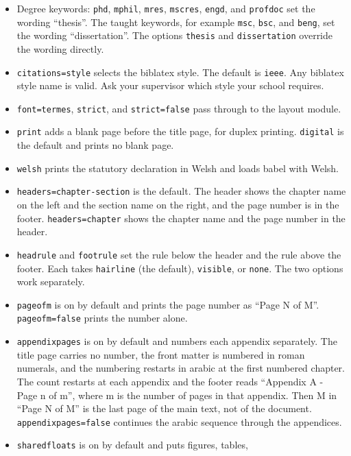 \documentclass[a4paper,12pt]{article}
\begin{document}
\begin{itemize}
  \item Degree keywords: \verb|phd|, \verb|mphil|, \verb|mres|,
        \verb|mscres|, \verb|engd|, and \verb|profdoc| set the wording
        ``thesis''. The taught keywords, for example \verb|msc|, \verb|bsc|,
        and \verb|beng|, set the wording ``dissertation''. The options
        \verb|thesis| and \verb|dissertation| override the wording directly.
  \item \verb|citations=style| selects the biblatex style. The default
        is \verb|ieee|. Any biblatex style name is valid. Ask your supervisor
        which style your school requires.
  \item \verb|font=termes|, \verb|strict|, and \verb|strict=false| pass
        through to the layout module.
  \item \verb|print| adds a blank page before the title page, for duplex
        printing. \verb|digital| is the default and prints no blank page.
  \item \verb|welsh| prints the statutory declaration in Welsh and loads
        babel with Welsh.
  \item \verb|headers=chapter-section| is the default. The header shows the
        chapter name on the left and the section name on the right, and the
        page number is in the footer. \verb|headers=chapter| shows the chapter
        name and the page number in the header.
  \item \verb|headrule| and \verb|footrule| set the rule below the header and
        the rule above the footer. Each takes \verb|hairline| (the default),
        \verb|visible|, or \verb|none|. The two options work separately.
  \item \verb|pageofm| is on by default and prints the page number as
        ``Page N of M''. \verb|pageofm=false| prints the number alone.
  \item \verb|appendixpages| is on by default and numbers each appendix
        separately. The title page carries no number, the front matter is
        numbered in roman numerals, and the numbering restarts in arabic at
        the first numbered chapter. The count restarts at each appendix and
        the footer reads ``Appendix A - Page n of m'', where m is the number
        of pages in that appendix. Then M in ``Page N of M'' is the last page
        of the main text, not of the document.
        \verb|appendixpages=false| continues the arabic sequence through
        the appendices.
  \item \verb|sharedfloats| is on by default and puts figures, tables,

\end{itemize}
\end{document}
